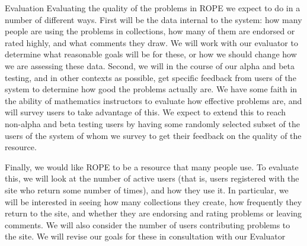 \documentclass[11pt]{article}
\begin{document}
\begin{section}{Evaluation}
Evaluating the quality of the problems in ROPE we expect to do in a number
of different ways.  First will be the data internal to the system: how
many people are using the problems in collections, how many of them are
endorsed or rated highly, and what comments they draw.  We will work with
our evaluator to determine what reasonable goals will be for these, or how
we should change how we are assessing these data.  Second, we will in the
course of our alpha and beta testing, and in other contexts as possible,
get specific feedback from users of the system to determine how good the
problems actually are.  We have some faith in the ability of mathematics
instructors to evaluate how effective problems are, and will survey users
to take advantage of this.  We expect to extend this to reach non-alpha
and beta testing users by having some randomly selected subset of the
users of the system of whom we survey to get their feedback on the
quality of the resource.

Finally, we would like ROPE to be a resource that many people use.  To
evaluate this, we will look at the number of active users (that is, users
registered with the site who return some number of times), and how they
use it.  In particular, we will be interested in seeing how many
collections they create, how frequently they return to the site, and
whether they are endorsing and rating problems or leaving comments.  We
will also consider the number of users contributing problems to the site.
We will revise our goals for these in consultation with our Evaluator



\end{section}
\end{document}
